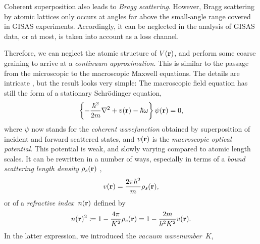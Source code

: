 Coherent superposition also leads to \textit{Bragg scattering}.
%
However, Bragg scattering by atomic lattices only occurs at angles
far above the small-angle range covered in GISAS experiments.
Accordingly, it can be neglected in the analysis of GISAS data,
or at most, is taken into account as a loss channel.

Therefore,
we can neglect the atomic structure of $V(\mathbf{r})$,
and perform some coarse graining to
arrive at a \textit{continuum approximation}.
%
This is 
similar to the passage from
the microscopic to the macroscopic Maxwell equations.
The details are intricate \cite{Sea89,Lax51},
but the result \cite[eq.~2.8.32]{Sea89} looks very simple:
The macroscopic field equation
has still the form of a stationary Schrödinger equation,
%
\begin{equation}\label{EmacrSchrodi}
  \left\{-\frac{\hbar^2}{2m}\mathbf{\nabla}^2+v(\mathbf{r})-\hbar\omega\right\} \psi(\mathbf{r}) = 0,
\end{equation}
%
%
where $\psi$ now stands for the \textit{coherent wavefunction}
%
%
obtained by superposition of
incident and forward scattered states,
and $v(\mathbf{r})$ is the \textit{macroscopic optical potential}.
%
This potential is weak, and slowly varying compared to atomic length scales.
It can be rewritten in a number of ways,
especially in terms of a
\textit{bound scattering length density}
%
$\rho_s(\mathbf{r})$ \cite[eq.\ 2.8.37]{Sea89},
%
\begin{equation}
  v(\mathbf{r})=\frac{2\pi \hbar^2}{m}\rho_s(\mathbf{r}),  
\end{equation}
or of a \textit{refractive index}~$n(\mathbf{r})$
%
%
defined by
\begin{equation}\label{EnRefrIndx}
  n(\mathbf{r})^2\coloneqq 1-\frac{4\pi}{K^2}\rho_s(\mathbf{r}) = 1 -\frac{2m}{\hbar^2 K^2}v(\mathbf{r}).
\end{equation}
In the latter expression,
we introduced the \textit{vacuum wavenumber}~$K$,
%
